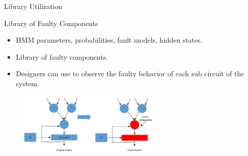 \documentclass[aspectratio=1610]{beamer}
\begin{document}
\begin{frame}{Library Utilization}

\begin{block}{Library of Faulty Components}
\end{block}
\begin{itemize}
\item HMM parameters, probabilities, fault models, hidden states.
\item Library of faulty components.
\item Designers can use to observe the faulty behavior of each sub circuit of the system.

\end{itemize}



\begin{figure}[tb!]
 \centering
  \captionsetup{justification=centering}    
   \includegraphics[width=0.6\textwidth, center]{Figures/MAC.pdf}
\label{fig:lib1}
\end{figure}


\end{frame}
\end{document}
